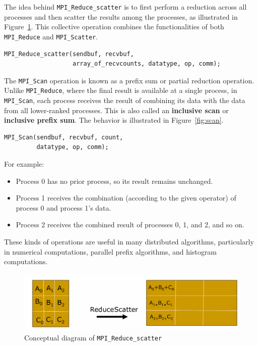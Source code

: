 \documentclass[12pt]{book}
\begin{document}
The idea behind \texttt{MPI\_Reduce\_scatter} is to first perform a reduction across all processes and then scatter the results among the processes, as illustrated in Figure~\ref{fig:reducescatter}. This collective operation combines the functionalities of both \texttt{MPI\_Reduce} and \texttt{MPI\_Scatter}.

\begin{lstlisting}[style=cppstyle]
MPI_Reduce_scatter(sendbuf, recvbuf,
                   array_of_recvcounts, datatype, op, comm);
\end{lstlisting}

The \texttt{MPI\_Scan} operation is known as a prefix sum or partial reduction operation. Unlike \texttt{MPI\_Reduce}, where the final result is available at a single process, in \texttt{MPI\_Scan}, each process receives the result of combining its data with the data from all lower-ranked processes. This is also called an \textbf{inclusive scan} or \textbf{inclusive prefix sum}. The behavior is illustrated in Figure~\ref{fig:scan}.

\begin{lstlisting}[style=cppstyle]
MPI_Scan(sendbuf, recvbuf, count,
         datatype, op, comm);
\end{lstlisting}

For example:
\begin{itemize}
    \item Process 0 has no prior process, so its result remains unchanged.
    \item Process 1 receives the combination (according to the given operator) of process 0 and process 1's data.
    \item Process 2 receives the combined result of processes 0, 1, and 2, and so on.
\end{itemize}

These kinds of operations are useful in many distributed algorithms, particularly in numerical computations, parallel prefix algorithms, and histogram computations.

\begin{figure}[H]
    \centering
    \includegraphics[width=0.75\linewidth]{images/reducescatter.png}
    \caption{Conceptual diagram of \texttt{MPI\_Reduce\_scatter}}
    \label{fig:reducescatter}
\end{figure}
\end{document}
